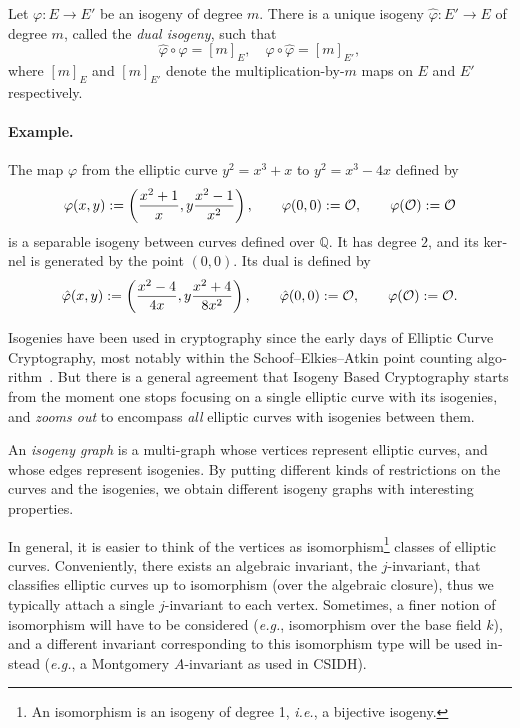 \begin{otherlanguage}{english}
  \begin{theorem}
    Let $\varphi:E\to E'$ be an isogeny of degree $m$. %
    There is a unique isogeny $\hat{\varphi}:E'\to E$ of degree $m$,
    called the \emph{dual isogeny}, such that
    \[\hat{\varphi}\circ\varphi = [m]_E, \quad \varphi\circ\hat{\varphi} = [m]_{E'},\] %
    where $[m]_E$ and $[m]_{E'}$ denote the multiplication-by-$m$ maps
    on $E$ and $E'$ respectively.
  \end{theorem}

  \paragraph{Example.}
  The map $\varphi$ from the elliptic curve $y^2=x^3+x$ to $y^2=x^3-4x$
  defined by
  \begin{equation*}
      \varphi(x,y) := \left(\frac{x^2+1}{x},y\frac{x^2-1}{x^2}\right),\qquad
      \varphi(0,0) := \mathcal{O}, \qquad \varphi(\mathcal{O}) := \mathcal{O}
  \end{equation*}
  is a separable isogeny between curves defined over $\mathbb{Q}$. %
  It has degree $2$, and its kernel is generated by the point
  $(0,0)$. %
  Its dual is defined by
  \begin{equation*}
      \hat\varphi(x,y) := \left(\frac{x^2-4}{4x},y\frac{x^2+4}{8x^2}\right),\qquad
      \hat\varphi(0,0) := \mathcal{O},\qquad \varphi(\mathcal{O}) := \mathcal{O}.
  \end{equation*}

  Isogenies have been used in cryptography since the early days of
  Elliptic Curve Cryptography, most notably within the
  Schoof--Elkies--Atkin point counting algorithm~\cite{schoof95}.  But
  there is a general agreement that Isogeny Based Cryptography starts
  from the moment one stops focusing on a single elliptic curve with
  its isogenies, and \emph{zooms out} to encompass \emph{all} elliptic
  curves with isogenies between them.

  An \emph{isogeny graph} is a multi-graph whose vertices represent
  elliptic curves, and whose edges represent isogenies. By putting
  different kinds of restrictions on the curves and the isogenies, we
  obtain different isogeny graphs with interesting properties.

  In general, it is easier to think of the vertices as
  isomorphism\footnote{An isomorphism is an isogeny of degree 1,
    \emph{i.e.}, a bijective isogeny.} classes of elliptic
  curves. Conveniently, there exists an algebraic invariant, the
  $j$-invariant, that classifies elliptic curves up to isomorphism
  (over the algebraic closure), thus we typically attach a single
  $j$-invariant to each vertex. Sometimes, a finer notion of
  isomorphism will have to be considered (\emph{e.g.}, isomorphism
  over the base field $k$), and a different invariant corresponding to
  this isomorphism type will be used instead (\emph{e.g.}, a
  Montgomery $A$-invariant as used in CSIDH).
  

\end{otherlanguage}
